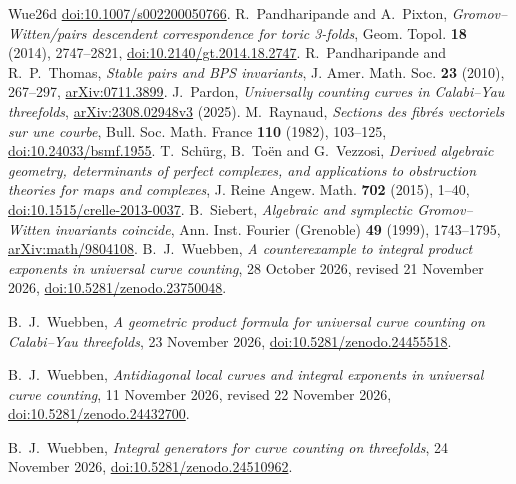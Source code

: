 \begin{thebibliography}{Wue26d}
\href{https://doi.org/10.1007/s002200050766}{doi:10.1007/s002200050766}.
 R.~Pandharipande and A.~Pixton,
\emph{Gromov--Witten/pairs descendent correspondence for toric 3-folds},
Geom. Topol. \textbf{18} (2014), 2747--2821,
\href{https://doi.org/10.2140/gt.2014.18.2747}{doi:10.2140/gt.2014.18.2747}.
 R.~Pandharipande and R.~P.~Thomas,
\emph{Stable pairs and BPS invariants}, J. Amer. Math. Soc. \textbf{23}
(2010), 267--297, \href{https://arxiv.org/abs/0711.3899}{arXiv:0711.3899}.
 J.~Pardon,
\emph{Universally counting curves in Calabi--Yau threefolds},
\href{https://arxiv.org/abs/2308.02948v3}{arXiv:2308.02948v3} (2025).
 M.~Raynaud, \emph{Sections des fibr\'es vectoriels sur une courbe}, Bull. Soc. Math. France \textbf{110} (1982), 103--125, \href{https://doi.org/10.24033/bsmf.1955}{doi:10.24033/bsmf.1955}.
 T.~Sch\"urg, B.~To\"en and G.~Vezzosi,
\emph{Derived algebraic geometry, determinants of perfect complexes,
and applications to obstruction theories for maps and complexes},
J. Reine Angew. Math. \textbf{702} (2015), 1--40,
\href{https://doi.org/10.1515/crelle-2013-0037}{doi:10.1515/crelle-2013-0037}.
 B.~Siebert, \emph{Algebraic and symplectic
Gromov--Witten invariants coincide}, Ann. Inst. Fourier (Grenoble)
\textbf{49} (1999), 1743--1795,
\href{https://arxiv.org/abs/math/9804108}{arXiv:math/9804108}.
 B.~J.~Wuebben,
\emph{A counterexample to integral product exponents in universal curve counting}, 28 October 2026, revised 21 November 2026,
\href{https://doi.org/10.5281/zenodo.23750048}{doi:10.5281/zenodo.23750048}.

 B.~J.~Wuebben,
\emph{A geometric product formula for universal curve counting on Calabi--Yau threefolds}, 23 November 2026,
\href{https://doi.org/10.5281/zenodo.24455518}{doi:10.5281/zenodo.24455518}.

 B.~J.~Wuebben,
\emph{Antidiagonal local curves and integral exponents in universal curve counting}, 11 November 2026, revised 22 November 2026,
\href{https://doi.org/10.5281/zenodo.24432700}{doi:10.5281/zenodo.24432700}.

 B.~J.~Wuebben,
\emph{Integral generators for curve counting on threefolds}, 24 November 2026,
\href{https://doi.org/10.5281/zenodo.24510962}{doi:10.5281/zenodo.24510962}.

\end{thebibliography}
